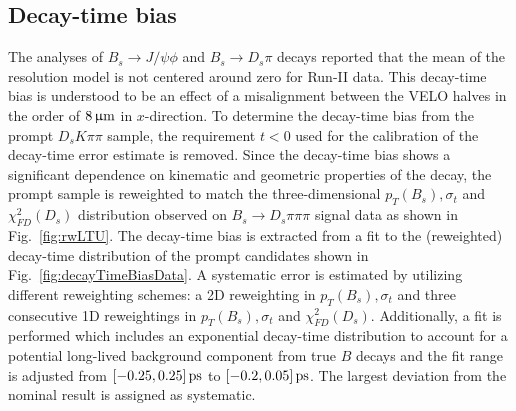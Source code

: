 %
%
%




\clearpage
\subsection{Decay-time bias}
\label{ssec:bias}


The analyses of $B_s \to J/\psi \phi$\cite{Aaij:2019vot} and $B_s \to D_s \pi$\cite{DspiRun2} decays 
reported that the mean of the resolution model is not centered around zero for Run-II data.
This decay-time bias is understood to be an effect of a misalignment
between the VELO halves in the order of $8{\,\upmu\mathrm{m}}$ in $x$-direction.
To determine the decay-time bias from the prompt $D_sK\pi\pi$ sample, the requirement $t<0$ used for the calibration of the decay-time error estimate is removed.
Since the decay-time bias shows a significant dependence on kinematic and geometric properties of the decay, 
the prompt sample is reweighted to match the three-dimensional $p_T(B_s),\sigma_t$ and $\chi^{2}_{FD}(D_s)$
distribution observed on $B_s \to D_s \pi\pi\pi$ signal data as shown in Fig.~\ref{fig:rwLTU}.
The decay-time bias is extracted from a fit to the (reweighted) decay-time distribution of the prompt candidates shown in Fig.~\ref{fig:decayTimeBiasData}.
A systematic error is estimated by utilizing different reweighting schemes: a 2D reweighting in $p_T(B_s),\sigma_t$ 
and three consecutive 1D reweightings in $p_T(B_s),\sigma_t$ and $\chi^{2}_{FD}(D_s)$.
Additionally, a fit is performed which includes an exponential decay-time distribution to account for a potential long-lived background component from true $B$ decays
and the fit range is adjusted from $[-0.25,0.25]{\mathrm{ \,ps}}$ to $[-0.2,0.05]{\mathrm{ \,ps}}$.
The largest deviation from the nominal result is assigned as systematic.

